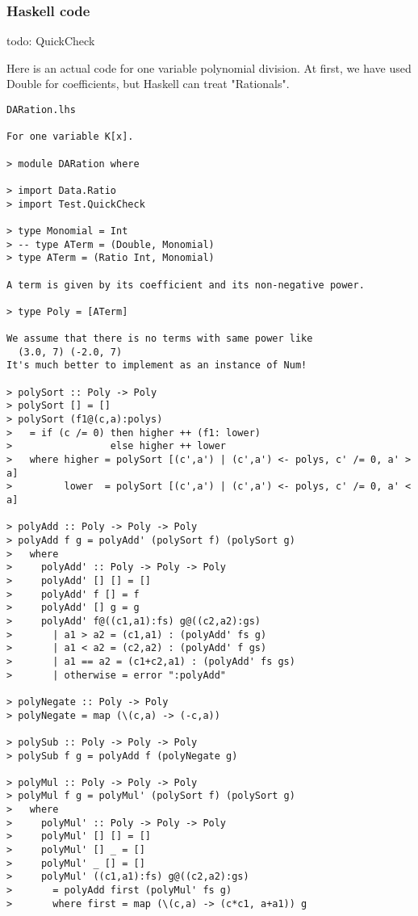 \documentclass[11pt]{book}
\begin{document}
\subsubsection{Haskell code}
todo: QuickCheck

Here is an actual code for one variable polynomial division.
At first, we have used Double for coefficients, but Haskell can treat "Rationals".

\begin{verbatim}
DARation.lhs

For one variable K[x].

> module DARation where

> import Data.Ratio 
> import Test.QuickCheck

> type Monomial = Int
> -- type ATerm = (Double, Monomial)
> type ATerm = (Ratio Int, Monomial)

A term is given by its coefficient and its non-negative power.

> type Poly = [ATerm]

We assume that there is no terms with same power like
  (3.0, 7) (-2.0, 7)
It's much better to implement as an instance of Num!

> polySort :: Poly -> Poly
> polySort [] = []
> polySort (f1@(c,a):polys) 
>   = if (c /= 0) then higher ++ (f1: lower)
>                 else higher ++ lower
>   where higher = polySort [(c',a') | (c',a') <- polys, c' /= 0, a' > a]
>         lower  = polySort [(c',a') | (c',a') <- polys, c' /= 0, a' < a]

> polyAdd :: Poly -> Poly -> Poly
> polyAdd f g = polyAdd' (polySort f) (polySort g) 
>   where 
>     polyAdd' :: Poly -> Poly -> Poly
>     polyAdd' [] [] = []
>     polyAdd' f [] = f
>     polyAdd' [] g = g
>     polyAdd' f@((c1,a1):fs) g@((c2,a2):gs) 
>       | a1 > a2 = (c1,a1) : (polyAdd' fs g)
>       | a1 < a2 = (c2,a2) : (polyAdd' f gs)
>       | a1 == a2 = (c1+c2,a1) : (polyAdd' fs gs)
>       | otherwise = error ":polyAdd"

> polyNegate :: Poly -> Poly
> polyNegate = map (\(c,a) -> (-c,a))

> polySub :: Poly -> Poly -> Poly
> polySub f g = polyAdd f (polyNegate g)

> polyMul :: Poly -> Poly -> Poly
> polyMul f g = polyMul' (polySort f) (polySort g)
>   where 
>     polyMul' :: Poly -> Poly -> Poly
>     polyMul' [] [] = []
>     polyMul' [] _ = []
>     polyMul' _ [] = []
>     polyMul' ((c1,a1):fs) g@((c2,a2):gs) 
>       = polyAdd first (polyMul' fs g)
>       where first = map (\(c,a) -> (c*c1, a+a1)) g


\end{verbatim}
\end{document}
